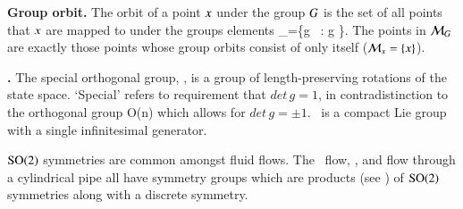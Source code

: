 \begin{definition}
\label{def:grouporbit}
\textbf{Group orbit.}
The orbit of a point $x$ under the group $G$ is the set of all points that $x$ are mapped to under the groups elements
\beq
\pS_\ssp=\{{g} \, \ssp: g \in \Group\}.
\eeq
The points in ${\cal M}_{G}$ are exactly those points whose group orbits consist of only itself (${\cal M}_{x}=\{x\}$).
\end{definition}

\begin{definition}
\label{def:SO2}
\textbf{.} The special orthogonal group, , is a group of length-preserving rotations of the state space. `Special' refers to requirement that $det \, g = 1$, in contradistinction to the orthogonal group O(n) which allows for $det \, g = \pm 1$. \ is a compact Lie group with a single infinitesimal generator.
\end{definition}

$\textrm{SO}(2)$ symmetries are common amongst fluid flows. The \KS\ flow, {\pCf}, and flow through a cylindrical pipe all have symmetry groups which are products (see ) of $\textrm{SO}(2)$ symmetries along with a discrete symmetry.

